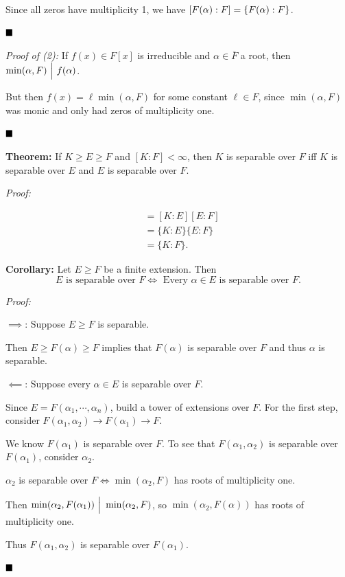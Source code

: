 Since all zeros have multiplicity 1, we have
\([F(\alpha): F] = \left\{{F(\alpha): F}\right\}\).

\(\qed\)

\emph{Proof of (2):} If \(f(x) \in F[x]\) is irreducible and
\(\alpha\in \overline F\) a root, then
\(\min(\alpha, F) {~\Bigm| ~} f(\alpha)\).

But then \(f(x) = \ell \min(\alpha, F)\) for some constant
\(\ell \in F\), since \(\min(\alpha, F)\) was monic and only had zeros
of multiplicity one.

\(\qed\)

\textbf{Theorem:} If \(K \geq E \geq F\) and \([K:F] < \infty\), then
\(K\) is separable over \(F\) iff \(K\) is separable over \(E\) and
\(E\) is separable over \(F\).

\emph{Proof:}

\begin{align*}
[K: F]
&= [K:E] [E: F] \\
&= \{K:E\} \{E: F\} \\
&= \{K: F\}
.\end{align*}

\textbf{Corollary:} Let \(E \geq F\) be a finite extension. Then \[
E \text{ is separable over } F \iff \text{ Every } \alpha \in E \text{ is separable over } F
.\]

\emph{Proof:}

\(\implies\): Suppose \(E \geq F\) is separable.

Then \(E \geq F(\alpha) \geq F\) implies that \(F(\alpha)\) is separable
over \(F\) and thus \(\alpha\) is separable.

\(\impliedby\): Suppose every \(\alpha \in E\) is separable over \(F\).

Since \(E = F(\alpha_1, \cdots, \alpha_n)\), build a tower of extensions
over \(F\). For the first step, consider
\(F(\alpha_1, \alpha_2) \to F(\alpha_1) \to F\).

We know \(F(\alpha_1)\) is separable over \(F\). To see that
\(F(\alpha_1, \alpha_2)\) is separable over \(F(\alpha_1)\), consider
\(\alpha_2\).

\(\alpha_2\) is separable over \(F \iff \min(\alpha_2, F)\) has roots of
multiplicity one.

Then \(\min(\alpha_2, F(\alpha_1)) {~\Bigm| ~} \min(\alpha_2, F)\), so
\(\min(\alpha_2, F(\alpha))\) has roots of multiplicity one.

Thus \(F(\alpha_1, \alpha_2)\) is separable over \(F(\alpha_1)\).

\(\qed\)

